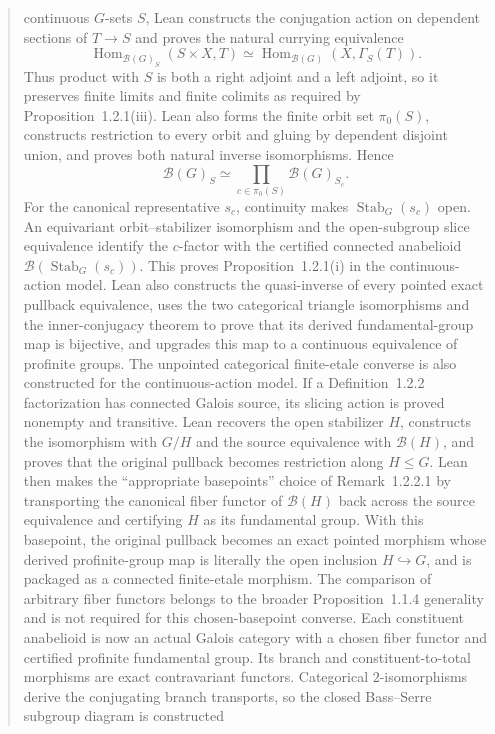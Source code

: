 \documentclass[11pt]{article}
\theoremstyle{plain}
\theoremstyle{definition}
\theoremstyle{remark}
\begin{document}
\begin{abstract}
continuous $G$-sets $S$, Lean constructs the conjugation action on dependent
sections of $T\to S$ and proves the natural currying equivalence
\[
\operatorname{Hom}_{\mathcal B(G)_S}(S\times X,T)
\simeq
\operatorname{Hom}_{\mathcal B(G)}(X,\Gamma_S(T)).
\]
Thus product with $S$ is both a right adjoint and a left adjoint, so it
preserves finite limits and finite colimits as required by
Proposition~1.2.1(iii).  Lean also forms the finite orbit set $\pi_0(S)$,
constructs restriction to every orbit and gluing by dependent disjoint union,
and proves both natural inverse isomorphisms.  Hence
\[
\mathcal B(G)_S\simeq
\prod_{c\in\pi_0(S)}\mathcal B(G)_{S_c}.
\]
For the canonical representative $s_c$, continuity makes
$\operatorname{Stab}_G(s_c)$ open.  An equivariant orbit--stabilizer
isomorphism and the open-subgroup slice equivalence identify the $c$-factor
with the certified connected anabelioid
$\mathcal B(\operatorname{Stab}_G(s_c))$.  This proves
Proposition~1.2.1(i) in the continuous-action model.  Lean also constructs the
quasi-inverse of every pointed exact pullback equivalence, uses the two
categorical triangle isomorphisms and the inner-conjugacy theorem to prove
that its derived fundamental-group map is bijective, and upgrades this map to
a continuous equivalence of profinite groups.  The unpointed categorical
finite-etale converse is also constructed for the continuous-action model.
If a Definition~1.2.2 factorization has connected Galois source, its slicing
action is proved nonempty and transitive.  Lean recovers the open stabilizer
$H$, constructs the isomorphism with $G/H$ and the source equivalence with
$\mathcal B(H)$, and proves that the original pullback becomes restriction
along $H\leq G$.  Lean then makes the ``appropriate basepoints'' choice of
Remark~1.2.2.1 by transporting the canonical fiber functor of
$\mathcal B(H)$ back across the source equivalence and certifying $H$ as its
fundamental group.  With this basepoint, the original pullback becomes an
exact pointed morphism whose derived profinite-group map is literally the
open inclusion $H\hookrightarrow G$, and is packaged as a connected
finite-etale morphism.  The comparison of arbitrary fiber functors belongs to
the broader Proposition~1.1.4 generality and is not required for this
chosen-basepoint converse.
Each constituent anabelioid is now an actual Galois category with a chosen
fiber functor and certified profinite fundamental group.  Its branch and constituent-to-total morphisms are exact
contravariant functors.  Categorical $2$-isomorphisms derive the conjugating
branch transports, so the closed Bass--Serre subgroup diagram is constructed

\end{abstract}
\end{document}
